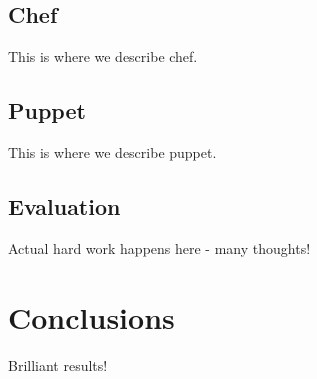 \subsection{Chef}

This is where we describe chef.

\subsection{Puppet}

This is where we describe puppet.

\subsection{Evaluation}

Actual hard work happens here - many thoughts!


\section{Conclusions}

Brilliant results!

